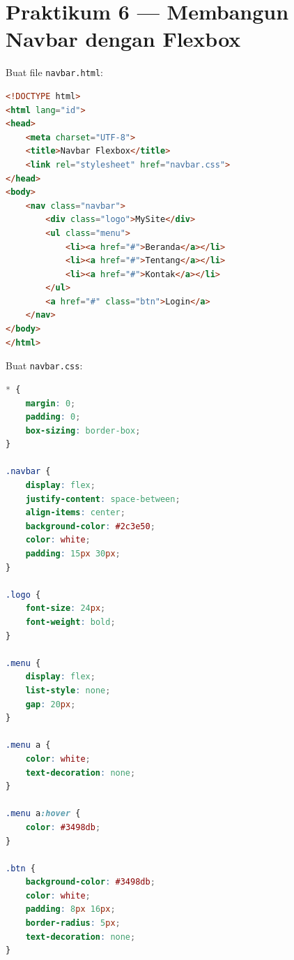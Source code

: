 \section{Praktikum 6 --- Membangun Navbar dengan Flexbox}
\label{sec:flex-praktik-navbar}

\begin{langkah}
  \item Buat file \texttt{navbar.html}:
\end{langkah}

\begin{lstlisting}[language=HTML, caption={Struktur navbar.html}, label={lst:navbar-html}]
<!DOCTYPE html>
<html lang="id">
<head>
    <meta charset="UTF-8">
    <title>Navbar Flexbox</title>
    <link rel="stylesheet" href="navbar.css">
</head>
<body>
    <nav class="navbar">
        <div class="logo">MySite</div>
        <ul class="menu">
            <li><a href="#">Beranda</a></li>
            <li><a href="#">Tentang</a></li>
            <li><a href="#">Kontak</a></li>
        </ul>
        <a href="#" class="btn">Login</a>
    </nav>
</body>
</html>
\end{lstlisting}

\begin{langkah}
  \item Buat \texttt{navbar.css}:
\end{langkah}

\begin{lstlisting}[language=CSS, caption={Gaya navbar dengan flexbox}, label={lst:navbar-css}]
* {
    margin: 0;
    padding: 0;
    box-sizing: border-box;
}

.navbar {
    display: flex;
    justify-content: space-between;
    align-items: center;
    background-color: #2c3e50;
    color: white;
    padding: 15px 30px;
}

.logo {
    font-size: 24px;
    font-weight: bold;
}

.menu {
    display: flex;
    list-style: none;
    gap: 20px;
}

.menu a {
    color: white;
    text-decoration: none;
}

.menu a:hover {
    color: #3498db;
}

.btn {
    background-color: #3498db;
    color: white;
    padding: 8px 16px;
    border-radius: 5px;
    text-decoration: none;
}
\end{lstlisting}

